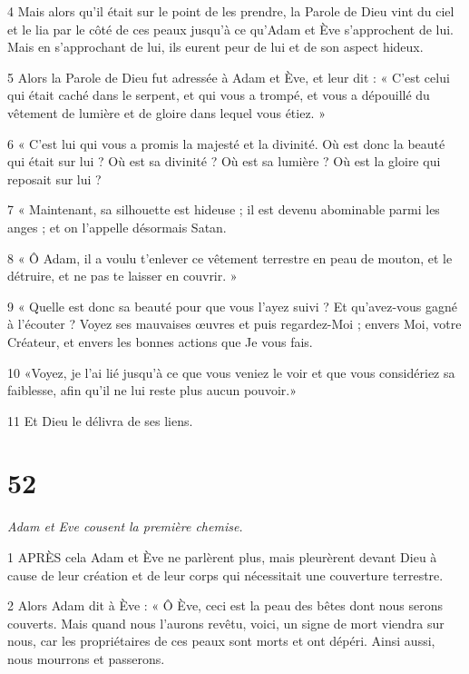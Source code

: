 \par 4 Mais alors qu'il était sur le point de les prendre, la Parole de Dieu vint du ciel et le lia par le côté de ces peaux jusqu'à ce qu'Adam et Ève s'approchent de lui. Mais en s'approchant de lui, ils eurent peur de lui et de son aspect hideux.

\par 5 Alors la Parole de Dieu fut adressée à Adam et Ève, et leur dit : « C'est celui qui était caché dans le serpent, et qui vous a trompé, et vous a dépouillé du vêtement de lumière et de gloire dans lequel vous étiez. »

\par 6 « C'est lui qui vous a promis la majesté et la divinité. Où est donc la beauté qui était sur lui ? Où est sa divinité ? Où est sa lumière ? Où est la gloire qui reposait sur lui ?

\par 7 « Maintenant, sa silhouette est hideuse ; il est devenu abominable parmi les anges ; et on l’appelle désormais Satan.

\par 8 « Ô Adam, il a voulu t'enlever ce vêtement terrestre en peau de mouton, et le détruire, et ne pas te laisser en couvrir. »

\par 9 « Quelle est donc sa beauté pour que vous l'ayez suivi ? Et qu’avez-vous gagné à l’écouter ? Voyez ses mauvaises œuvres et puis regardez-Moi ; envers Moi, votre Créateur, et envers les bonnes actions que Je vous fais.

\par 10 «Voyez, je l'ai lié jusqu'à ce que vous veniez le voir et que vous considériez sa faiblesse, afin qu'il ne lui reste plus aucun pouvoir.»

\par 11 Et Dieu le délivra de ses liens.

\chapter{52}

\par \textit{Adam et Eve cousent la première chemise.}

\par 1 APRÈS cela Adam et Ève ne parlèrent plus, mais pleurèrent devant Dieu à cause de leur création et de leur corps qui nécessitait une couverture terrestre.

\par 2 Alors Adam dit à Ève : « Ô Ève, ceci est la peau des bêtes dont nous serons couverts. Mais quand nous l'aurons revêtu, voici, un signe de mort viendra sur nous, car les propriétaires de ces peaux sont morts et ont dépéri. Ainsi aussi, nous mourrons et passerons.

